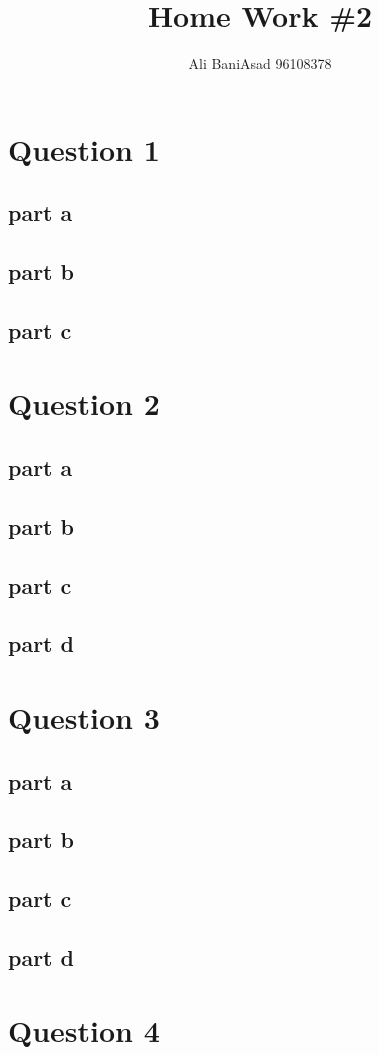 \documentclass{article}
\title{Home Work \#2}
\author{Ali BaniAsad 96108378}
\begin{document}
	\maketitle
	\section{Question 1}
	
	\subsection{part a}
	
	\subsection{part b}\label{Q1_b}
	
	\subsection{part c}
	
	\section{Question 2}
	\subsection{part a}
	
	\subsection{part b}
	
	\subsection{part c}
	
	\subsection{part d}
	
	\section{Question 3}
	
	\subsection{part a}
	
	\subsection{part b}
	
	\subsection{part c}
	
	\subsection{part d}
	
	\section{Question 4}
	
	\newpage
	\tableofcontents
	\newpage
	\listoffigures
\end{document}
